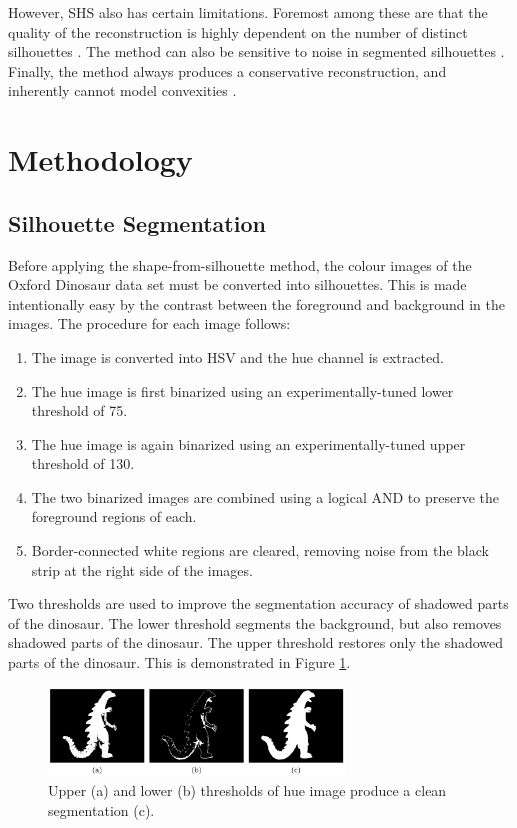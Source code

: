 However, SHS also has certain limitations. Foremost among these are that the quality of the reconstruction is highly dependent on the number of distinct silhouettes \cite{cheung_2005}. The method can also be sensitive to noise in segmented silhouettes \cite{lovell_2023b}. Finally, the method always produces a conservative reconstruction, and inherently cannot model convexities \cite{cheung_2005}.

\newpage
\section{Methodology}
\subsection{Silhouette Segmentation}

Before applying the shape-from-silhouette method, the colour images of the Oxford Dinosaur data set must be converted into silhouettes. This is made intentionally easy by the contrast between the foreground and background in the images. The procedure for each image follows:

\begin{enumerate}
  \item The image is converted into HSV and the hue channel is extracted.

  \item The hue image is first binarized using an experimentally-tuned lower threshold of 75.

  \item The hue image is again binarized using an experimentally-tuned upper threshold of 130.

  \item The two binarized images are combined using a logical AND to preserve the foreground regions of each.

  \item Border-connected white regions are cleared, removing noise from the black strip at the right side of the images.

\end{enumerate}

Two thresholds are used to improve the segmentation accuracy of shadowed parts of the dinosaur. The lower threshold segments the background, but also removes shadowed parts of the dinosaur. The upper threshold restores only the shadowed parts of the dinosaur. This is demonstrated in Figure \ref{fig:thresholds}.

\begin{figure}[ht]
  \centering
  \includegraphics[width=0.7\textwidth]{images/q2_thresholds.png}
  \caption{Upper (a) and lower (b) thresholds of hue image produce a clean segmentation (c).}
  \label{fig:thresholds}
\end{figure}

